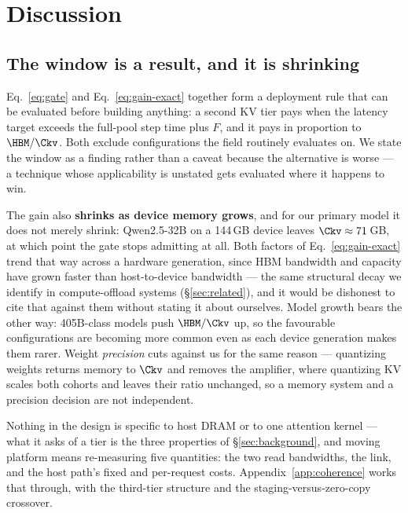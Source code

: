 %
\section{Discussion}
\label{sec:discussion}

\subsection{The window is a result, and it is shrinking}

Eq.~\ref{eq:gate} and Eq.~\ref{eq:gain-exact} together form a deployment rule that
can be evaluated before building anything: a second KV tier pays when the latency
target exceeds the full-pool step time plus $F$, and it pays in proportion to
$\HBM/\Ckv$. Both exclude configurations the field routinely evaluates on. We state
the window as a finding rather than a caveat because the alternative is worse --- a
technique whose applicability is unstated gets evaluated where it happens to win.

The gain also \textbf{shrinks as device memory grows}, and for our primary model it
does not merely shrink: Qwen2.5-32B on a 144\,GB device leaves $\Ckv \approx
71$\,GB, at which point the gate stops admitting at all. Both factors of
Eq.~\ref{eq:gain-exact} trend that way across a hardware generation, since HBM
bandwidth and capacity have grown faster than host-to-device bandwidth --- the same
structural decay we identify in compute-offload systems (\S\ref{sec:related}), and
it would be dishonest to cite that against them without stating it about ourselves.
Model growth bears the other way: 405B-class models push $\HBM/\Ckv$ up, so the
favourable configurations are becoming more common even as each device generation
makes them rarer. Weight \emph{precision} cuts against us for the same reason ---
quantizing weights returns memory to $\Ckv$ and removes the amplifier, where
quantizing KV scales both cohorts and leaves their ratio unchanged, so a memory
system and a precision decision are not independent.

Nothing in the design is specific to host DRAM or to one attention kernel --- what
it asks of a tier is the three properties of \S\ref{sec:background}, and moving
platform means re-measuring five quantities: the two read bandwidths, the link, and
the host path's fixed and per-request costs. Appendix~\ref{app:coherence} works
that through, with the third-tier structure and the staging-versus-zero-copy
crossover.

